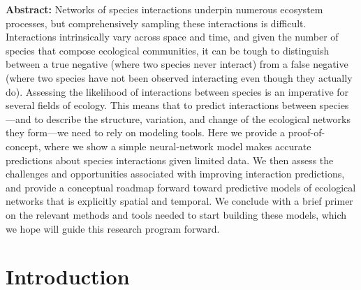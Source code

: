 \documentclass[11pt]{article}
\begin{document}
\vfill
\textbf{\sffamily Abstract: }Networks of species interactions underpin
numerous ecosystem processes, but comprehensively sampling these
interactions is difficult. Interactions intrinsically vary across space
and time, and given the number of species that compose ecological
communities, it can be tough to distinguish between a true negative
(where two species never interact) from a false negative (where two
species have not been observed interacting even though they actually
do). Assessing the likelihood of interactions between species is an
imperative for several fields of ecology. This means that to predict
interactions between species---and to describe the structure, variation,
and change of the ecological networks they form---we need to rely on
modeling tools. Here we provide a proof-of-concept, where we show a
simple neural-network model makes accurate predictions about species
interactions given limited data. We then assess the challenges and
opportunities associated with improving interaction predictions, and
provide a conceptual roadmap forward toward predictive models of
ecological networks that is explicitly spatial and temporal. We conclude
with a brief primer on the relevant methods and tools needed to start
building these models, which we hope will guide this research program
forward.
\vfill

\clearpage
\linenumbers
\pagestyle{normal}

\hypertarget{introduction}{%
\section{Introduction}\label{introduction}}
\end{document}
